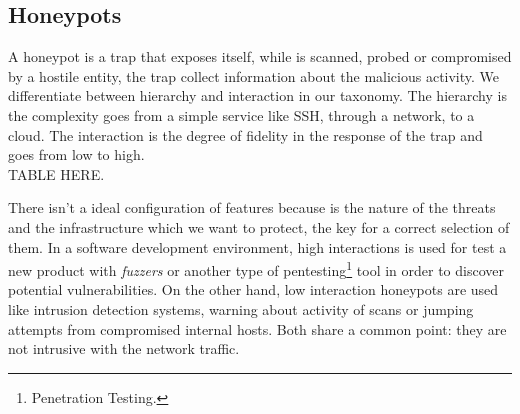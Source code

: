 \documentclass[a4paper]{llncs}
\begin{document}
	\subsection{Honeypots}
	A honeypot is a trap that exposes itself, while is scanned, probed or compromised by a hostile entity, the trap collect information about the malicious activity. We differentiate between hierarchy and interaction in our taxonomy. The hierarchy is the complexity goes from a simple service like SSH, through a network, to a cloud. The interaction is the degree of fidelity in the response of the trap and goes from low to high.\\
	TABLE HERE.
	
	There isn't a ideal configuration of features because 
	is the nature of the threats and the infrastructure which we want to protect, the key for a correct selection of them.
	In a software development environment, high interactions is used for 
	test a new product with {\it fuzzers} or another type of pentesting\footnote{Penetration Testing.}
	tool in order to discover potential vulnerabilities. On the other hand, low interaction honeypots are used like intrusion detection systems, warning about activity of scans or jumping attempts from compromised internal hosts. Both share a common point: they are not intrusive with the network traffic.
	
	
\end{document}
